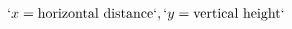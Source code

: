 \documentclass[preview]{standalone}
\begin{document}
\begin{align*}
`x = \text{horizontal distance}`, `y = \text{vertical height}`
\end{align*}
\end{document}
